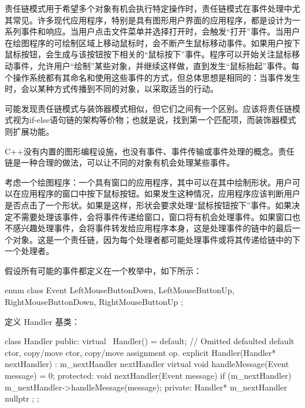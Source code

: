 
责任链模式用于希望多个对象有机会执行特定操作时，责任链模式在事件处理中尤其常见。许多现代应用程序，特别是具有图形用户界面的应用程序，都是设计为一系列事件和响应。当用户点击文件菜单并选择打开时，会触发“打开”事件。当用户在绘图程序的可绘制区域上移动鼠标时，会不断产生鼠标移动事件。如果用户按下鼠标按钮，会生成与该按钮按下相关的“鼠标按下”事件。程序可以开始关注鼠标移动事件，允许用户“绘制”某些对象，并继续这样做，直到发生“鼠标抬起”事件。每个操作系统都有其命名和使用这些事件的方式，但总体思想是相同的：当事件发生时，会以某种方式传播到不同的对象，以采取适当的行动。

可能发现责任链模式与装饰器模式相似，但它们之间有一个区别。应该将责任链模式视为if-else语句链的架构等价物；也就是说，找到第一个匹配项，而装饰器模式则扩展功能。

C++没有内置的图形编程设施，也没有事件、事件传输或事件处理的概念。责任链是一种合理的做法，可以让不同的对象有机会处理某些事件。


考虑一个绘图程序：一个具有窗口的应用程序，其中可以在其中绘制形状。用户可以在应用程序的窗口中按下鼠标按钮。如果发生这种情况，应用程序应该判断用户是否点击了一个形状。如果是这样，形状会要求处理“鼠标按钮按下”事件。如果决定不需要处理该事件，会将事件传递给窗口，窗口将有机会处理事件。如果窗口也不感兴趣处理事件，会将事件转发给应用程序本身，这是处理事件的链中的最后一个对象。这是一个责任链，因为每个处理者都可能处理事件或将其传递给链中的下一个处理者。


假设所有可能的事件都定义在一个枚举中，如下所示：

\begin{cpp}
enum class Event { LeftMouseButtonDown, LeftMouseButtonUp,
    RightMouseButtonDown, RightMouseButtonUp };
\end{cpp}

定义 Handler 基类：

\begin{cpp}
class Handler
{
    public:
        virtual ~Handler() = default;
        // Omitted defaulted default ctor, copy/move ctor, copy/move assignment op.
        explicit Handler(Handler* nextHandler) : m_nextHandler { nextHandler } { }
        virtual void handleMessage(Event message) = 0;
    protected:
        void nextHandler(Event message)
        {
            if (m_nextHandler) { m_nextHandler->handleMessage(message); }
        }
    private:
        Handler* m_nextHandler { nullptr };
};
\end{cpp}

